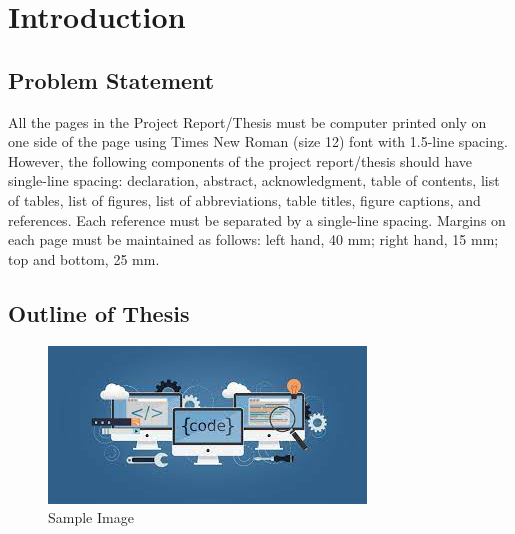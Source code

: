 \chapter{Introduction}  %



\section{\large Problem Statement} %

 

 

All the pages in the Project Report/Thesis must be computer printed only on one side of the page using
Times New Roman (size 12) font with 1.5-line spacing.
However, the following components of the project report/thesis should have single-line spacing: declaration, abstract, acknowledgment, table of contents, list of tables, list of figures, list of abbreviations, table titles, figure captions, and references. 
Each reference must be separated by a single-line spacing. Margins on each page must be maintained as
follows: left hand, 40 mm; right hand, 15 mm; top and bottom, 25 mm.  
\citep{Streftaris2004} 

\section{\large Outline of Thesis}
\begin{figure}[h!]
  \includegraphics[width=\linewidth]{images/image.jpg}
  \caption{Sample Image}
  \label{fig: Sample image}
\end{figure}
 
